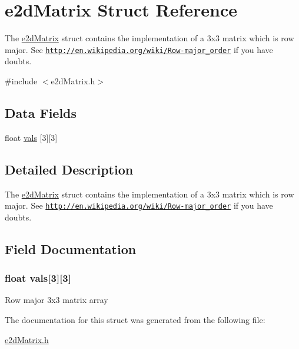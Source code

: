 \hypertarget{structe2dMatrix}{\section{e2d\-Matrix Struct Reference}
\label{structe2dMatrix}
}


The \hyperlink{structe2dMatrix}{e2d\-Matrix} struct contains the implementation of a 3x3 matrix which is row major. See \href{http://en.wikipedia.org/wiki/Row-major_order}{\tt http\-://en.\-wikipedia.\-org/wiki/\-Row-\/major\-\_\-order} if you have doubts.  




{\ttfamily \#include $<$e2d\-Matrix.\-h$>$}

\subsection*{Data Fields}
\begin{DoxyCompactItemize}
\item 
float \hyperlink{structe2dMatrix_ac06a92ccf2617d904678c51c6cf5a9bb}{vals} \mbox{[}3\mbox{]}\mbox{[}3\mbox{]}
\end{DoxyCompactItemize}


\subsection{Detailed Description}
The \hyperlink{structe2dMatrix}{e2d\-Matrix} struct contains the implementation of a 3x3 matrix which is row major. See \href{http://en.wikipedia.org/wiki/Row-major_order}{\tt http\-://en.\-wikipedia.\-org/wiki/\-Row-\/major\-\_\-order} if you have doubts. 

\subsection{Field Documentation}
\hypertarget{structe2dMatrix_ac06a92ccf2617d904678c51c6cf5a9bb}{
\subsubsection[{vals}]{\setlength{\rightskip}{0pt plus 5cm}float {\bf vals}\mbox{[}3\mbox{]}\mbox{[}3\mbox{]}}}\label{structe2dMatrix_ac06a92ccf2617d904678c51c6cf5a9bb}
Row major 3x3 matrix array 

The documentation for this struct was generated from the following file\-:\begin{DoxyCompactItemize}
\item 
\hyperlink{e2dMatrix_8h}{e2d\-Matrix.\-h}\end{DoxyCompactItemize}
